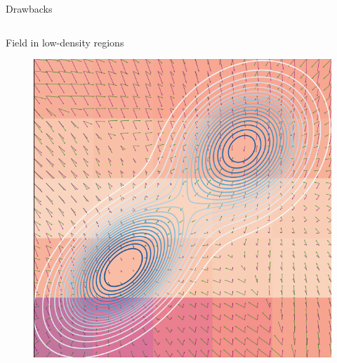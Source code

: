 \documentclass[aspectratio=169,xcolor=dvipsnames]{beamer}
\begin{document}
\begin{frame}{Drawbacks}
  \pause 

  \begin{columns}
    \begin{column}{0.4\textwidth}
      \centering
        Field in low-density regions
      \begin{figure}
        \centering
        \includegraphics[height=0.32\textheight]{figs/gen/score_field_training_0.png}
      \end{figure}


\end{column}
\end{columns}
\end{frame}
\end{document}
